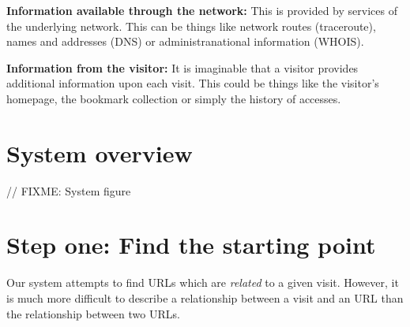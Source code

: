 \documentclass[a4paper]{danarticle}
\begin{document}
    \textbf{Information available through the network:} This is
    provided by services of the underlying network. This can
    be things like network routes (traceroute), names and addresses
    (DNS) or administranational information (WHOIS).
    
    \textbf{Information from the visitor:} It is imaginable that
    a visitor provides additional information upon each visit. 
    This could be things like the visitor's homepage, the 
    bookmark collection or simply the history of accesses.
  \section*{System overview}
    // FIXME: System figure
  \section*{Step one: Find the starting point}
    Our system attempts to find URLs which are \textit{related} to
    a given visit. However, it is much more difficult to describe
    a relationship between a visit and an URL than the relationship
    between two URLs.
    
\end{document}
